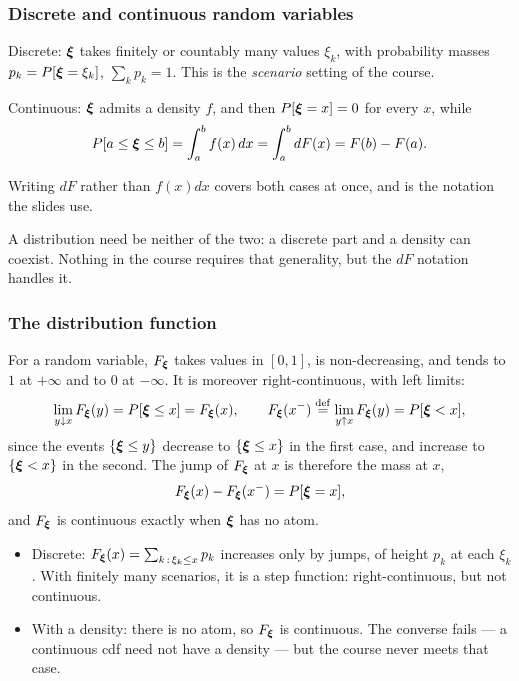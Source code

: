 \documentclass[aspectratio=169]{beamer}
\begin{document}
\begin{frame}
\frametitle{Discrete and continuous random variables}

{\red Discrete}: ${\boldsymbol{\xi}}$ takes finitely or countably many values $\xi_k$, with {\red probability masses} $p_k = P[{\boldsymbol{\xi}} = \xi_k]$, $\sum_k p_k = 1$. This is the {\it scenario} setting of the course.

\mbox{}

{\red Continuous}: ${\boldsymbol{\xi}}$ admits a {\red density} $f$, and then $P[{\boldsymbol{\xi}} = x] = 0$ for every $x$, while
\[
P[a \leq {\boldsymbol{\xi}} \leq b] = \int_a^b f(x)\,dx = \int_a^b dF(x) = F(b)-F(a).
\]

\mbox{}

Writing $dF$ rather than $f(x)dx$ covers both cases at once, and is the notation the slides use.

\mbox{}

{\footnotesize A distribution need be neither of the two: a discrete part and a density can coexist. Nothing in the course requires that generality, but the $dF$ notation handles it.}

\end{frame}

\begin{frame}
\frametitle{The distribution function}
\small

For a random variable, $F_{{\boldsymbol{\xi}}}$ takes values in $[0,1]$, is non-decreasing, and tends to $1$ at $+\infty$ and to $0$ at $-\infty$.
It is moreover {\red right-continuous}, with left limits:
\[
\lim_{y \downarrow x} F_{{\boldsymbol{\xi}}}(y) = P[{\boldsymbol{\xi}} \leq x] = F_{{\boldsymbol{\xi}}}(x),
\qquad
F_{{\boldsymbol{\xi}}}(x^-) \overset{\mathrm{def}}{=} \lim_{y \uparrow x} F_{{\boldsymbol{\xi}}}(y) = P[{\boldsymbol{\xi}} < x],
\]
since the events $\lbrace {\boldsymbol{\xi}} \leq y \rbrace$ decrease to $\lbrace {\boldsymbol{\xi}} \leq x \rbrace$ in the first case, and increase to $\lbrace {\boldsymbol{\xi}} < x \rbrace$ in the second.
The {\red jump} of $F_{{\boldsymbol{\xi}}}$ at $x$ is therefore the mass at $x$,
\[
F_{{\boldsymbol{\xi}}}(x) - F_{{\boldsymbol{\xi}}}(x^-) = P[{\boldsymbol{\xi}} = x],
\]
and $F_{{\boldsymbol{\xi}}}$ is continuous {\red exactly when ${\boldsymbol{\xi}}$ has no atom}.
\begin{itemize}
\item
{\blue Discrete}: $F_{{\boldsymbol{\xi}}}(x) = \sum_{k \,:\, \xi_k \leq x} p_k$ increases only by jumps, of height $p_k$ at each $\xi_k$. With finitely many scenarios, it is a {\red step function}: right-continuous, but not continuous.
\item
{\blue With a density}: there is no atom, so $F_{{\boldsymbol{\xi}}}$ is continuous. The converse fails --- a continuous cdf need not have a density --- but the course never meets that case.
\end{itemize}

\end{frame}
\end{document}
